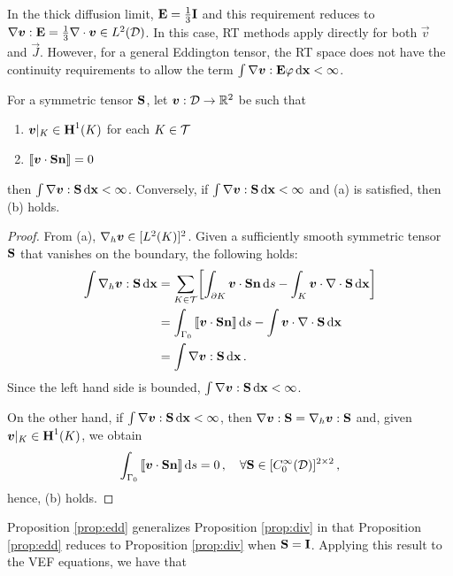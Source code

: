 \documentclass[../doc.tex]{subfiles}
\begin{document}
In the thick diffusion limit, $\E = \frac{1}{3}\I$ and this requirement reduces to $\nabla\vec{v}:\E = \frac{1}{3}\nabla\cdot\vec{v} \in L^2(\D)$. 
In this case, RT methods apply directly for both $\vec{v}$ and $\vec{J}$. However, for a general Eddington tensor, the RT space does not have the continuity requirements to allow the term $\int \nabla\vec{v} : \E\varphi \ud \x < \infty$. 

\begin{prop} \label{prop:edd}
For a symmetric tensor $\mat{S}$, let $\vec{v} : \D\rightarrow \R^2$ be such that 
\begin{enumerate}
	\item $\vec{v}|_K \in \H^1(K)$ for each $K \in \meshT$
	\item $\jump{\vec{v}\cdot\mat{S}\n} = 0$ 
\end{enumerate}
then $\int \nabla\vec{v} : \mat{S} \ud \x < \infty$. Conversely, if $\int \nabla\vec{v} : \mat{S} \ud \x < \infty$ and (a) is satisfied, then (b) holds. 
\end{prop}
\begin{proof}
From (a), $\nablah \vec{v} \in [L^2(K)]^2$. Given a sufficiently smooth symmetric tensor $\mat{S}$ that vanishes on the boundary, the following holds: 
	\begin{equation}
	\begin{aligned}
		\int \nablah\vec{v} : \mat{S} \ud \x &= \sum_{K\in\meshT} \bracket{\int_{\partial K} \vec{v}\cdot\mat{S}\n \ud s - \int_K \vec{v}\cdot\nabla\cdot\mat{S} \ud \x} \\
		&= \int_{\Gamma_0} \jump{\vec{v}\cdot\mat{S}\n} \ud s - \int \vec{v}\cdot\nabla\cdot\mat{S} \ud \x \\
		&= \int \nabla\vec{v} : \mat{S} \ud \x \,. 
	\end{aligned}
	\end{equation}
Since the left hand side is bounded, $\int \nabla\vec{v} : \mat{S} \ud \x < \infty$. 

On the other hand, if $\int \nabla\vec{v} : \mat{S} \ud \x < \infty$, then $\nabla\vec{v}:\mat{S} = \nablah\vec{v}:\mat{S}$ and, given $\vec{v}|_K\in\H^1(K)$, we obtain 
	\begin{equation}
		\int_{\Gamma_0} \jump{\vec{v}\cdot\mat{S}\n} \ud s = 0 \,, \quad \forall \mat{S} \in [C_0^\infty(\D)]^{2\times 2} \,,
	\end{equation}
hence, (b) holds. 
\end{proof}
Proposition \ref{prop:edd} generalizes Proposition \ref{prop:div} in that Proposition \ref{prop:edd} reduces to Proposition \ref{prop:div} when $\mat{S} = \mat{I}$. Applying this result to the VEF equations, we have that 
\end{document}
